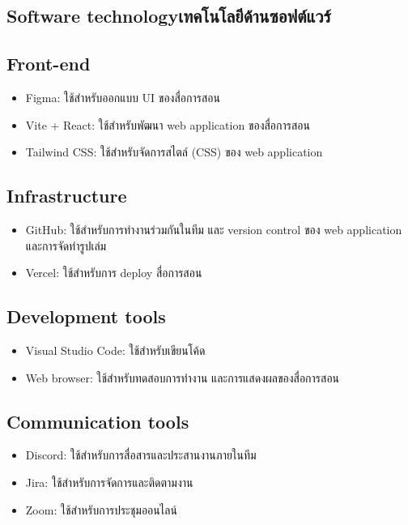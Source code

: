 \subsection{\ifenglish Software technology\else เทคโนโลยีด้านซอฟต์แวร์\fi}

\subsection*{Front-end}
\begin{itemize}
    \item Figma: ใช้สำหรับออกแบบ UI ของสื่อการสอน
    \item Vite + React: ใช้สำหรับพัฒนา web application ของสื่อการสอน
    \item Tailwind CSS: ใช้สำหรับจัดการสไตล์ (CSS) ของ web application
\end{itemize}

\subsection*{Infrastructure}
\begin{itemize}
    \item GitHub: ใช้สำหรับการทำงานร่วมกันในทีม และ version control ของ web application และการจัดทำรูปเล่ม
    \item Vercel: ใช้สำหรับการ deploy สื่อการสอน
\end{itemize}

\subsection*{Development tools}
\begin{itemize}
    \item Visual Studio Code: ใช้สำหรับเขียนโค้ด
    \item Web browser: ใช้สำหรับทดสอบการทำงาน และการแสดงผลของสื่อการสอน
\end{itemize}

\subsection*{Communication tools}
\begin{itemize}
    \item Discord: ใช้สำหรับการสื่อสารและประสานงานภายในทีม
    \item Jira: ใช้สำหรับการจัดการและติดตามงาน
    \item Zoom: ใช้สำหรับการประชุมออนไลน์
\end{itemize}

